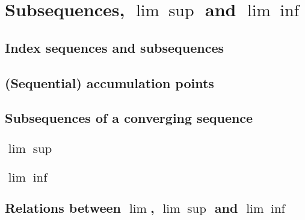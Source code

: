 \section{Subsequences, $\lim\sup$ and $\lim\inf$}

\subsection{Index sequences and subsequences}

\subsection{(Sequential) accumulation points}

\subsection{Subsequences of a converging sequence}

\subsection{$\lim\sup$}

\subsection{$\lim\inf$}

\subsection{Relations between $\lim$, $\lim\sup$ and $\lim\inf$}

